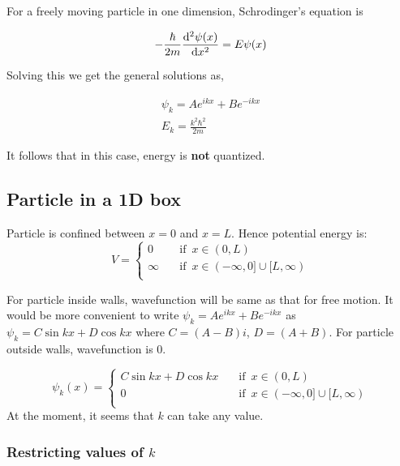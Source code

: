 \documentclass[11pt]{article}
\theoremstyle{definition}
\begin{document}
For a freely moving particle in one dimension, Schrodinger's equation is

\begin{shaded}
\begin{equation*}
    - \frac{\hbar}{2m} \dv[2]{\psi(x)}{x} = E \psi(x)
\end{equation*}

Solving this we get the general solutions as,

\begin{gather*}
    \psi_k = Ae^{ikx} + Be^{-ikx}\\
    E_k = \frac{k^2 \hbar^2}{2m}
\end{gather*}
\end{shaded}

It follows that in this case, energy is \textbf{not} quantized.

\subsection{Particle in a 1D box}

Particle is confined between $x=0$ and $x=L$. Hence potential energy is:
\begin{equation*}
V=\begin{cases}
          0 \quad &\text{if } \, x \in (0,L) \\
          \infty \quad &\text{if } \, x \in (-\infty,0] \cup [L, \infty) \\
     \end{cases}
\end{equation*}

For particle inside walls, wavefunction will be same as that for free motion. It would be more convenient to write $\psi_k =Ae^{ikx} + Be^{-ikx}$ as $\psi_k = C\sin{kx} + D \cos{kx}$ where $C = (A-B)i$, $D = (A+B)$. For particle outside walls, wavefunction is 0.

\begin{equation*}
\psi_k(x) =\begin{cases}
          C\sin{kx} + D \cos{kx} \quad &\text{if } \, x \in (0,L) \\
          0 \quad &\text{if } \, x \in (-\infty,0] \cup [L, \infty) \\
     \end{cases}
\end{equation*}
At the moment, it seems that $k$ can take any value.

\subsubsection{Restricting values of $k$}
\end{document}
